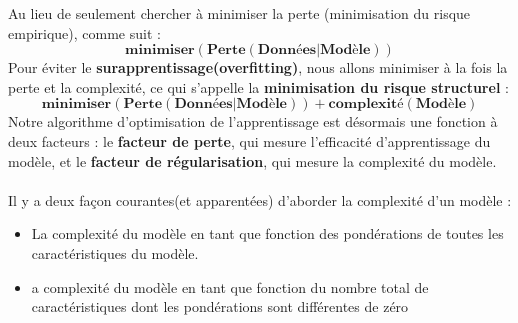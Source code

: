 \documentclass[french]{article}
\begin{document}
	Au lieu de seulement chercher à minimiser la perte (minimisation du risque empirique), comme suit : 
$$\bm{minimiser(Perte(Données|Modèle))}$$
Pour éviter le \textbf{surapprentissage(overfitting)}, nous allons minimiser à la fois la perte et la complexité, ce qui s'appelle la \textbf{minimisation du risque structurel} : 
$$\bm{minimiser(Perte(Données|Modèle))+complexité(Modèle)}$$
Notre algorithme d'optimisation de l'apprentissage est désormais une fonction à deux facteurs : le \textbf{facteur de perte}, qui mesure l'efficacité d'apprentissage du modèle, et le \textbf{facteur de régularisation}, qui mesure la complexité du modèle.\\\\
Il y a deux façon courantes(et apparentées) d'aborder la complexité d'un modèle : 
\begin{itemize}[label=\textbullet]
\item La complexité du modèle en tant que fonction des pondérations de toutes les caractéristiques du modèle.
\item a complexité du modèle en tant que fonction du nombre total de caractéristiques dont les pondérations sont différentes de zéro
\end{itemize}
\end{document}
